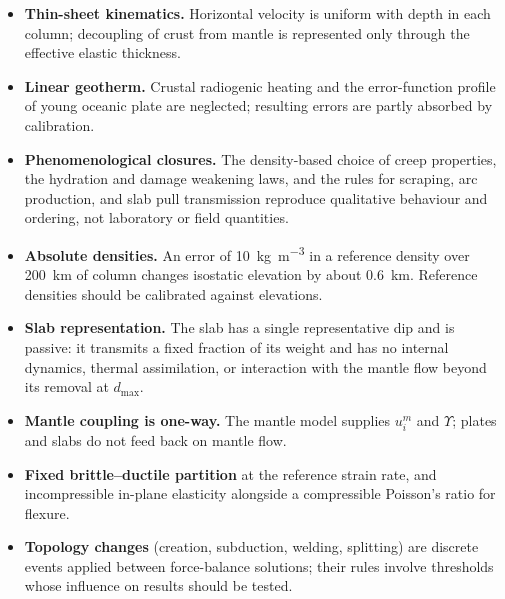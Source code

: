 \documentclass[11pt]{article}
\begin{document}
\begin{itemize}
  \item \textbf{Thin-sheet kinematics.} Horizontal velocity is uniform with depth
        in each column; decoupling of crust from mantle is represented only
        through the effective elastic thickness.
  \item \textbf{Linear geotherm.} Crustal radiogenic heating and the
        error-function profile of young oceanic plate are neglected; resulting
        errors are partly absorbed by calibration.
  \item \textbf{Phenomenological closures.} The density-based choice of creep
        properties, the hydration and damage weakening laws, and the rules for
        scraping, arc production, and slab pull transmission reproduce
        qualitative behaviour and ordering, not laboratory or field
        quantities.
  \item \textbf{Absolute densities.} An error of
        \SI{10}{\kilo\gram\per\cubic\metre} in a reference density over
        \SI{200}{\kilo\metre} of column changes isostatic elevation by about
        \SI{0.6}{\kilo\metre}. Reference densities should be calibrated against
        elevations.
  \item \textbf{Slab representation.} The slab has a single representative dip
        and is passive: it transmits a fixed fraction of its weight and has no
        internal dynamics, thermal assimilation, or interaction with the
        mantle flow beyond its removal at $d_{\max}$.
  \item \textbf{Mantle coupling is one-way.} The mantle model supplies $u^m_i$
        and $\Upsilon$; plates and slabs do not feed back on mantle flow.
  \item \textbf{Fixed brittle--ductile partition} at the reference strain rate,
        and incompressible in-plane elasticity alongside a compressible
        Poisson's ratio for flexure.
  \item \textbf{Topology changes} (creation, subduction, welding, splitting)
        are discrete events applied between force-balance solutions; their
        rules involve thresholds whose influence on results should be tested.
\end{itemize}
\end{document}
